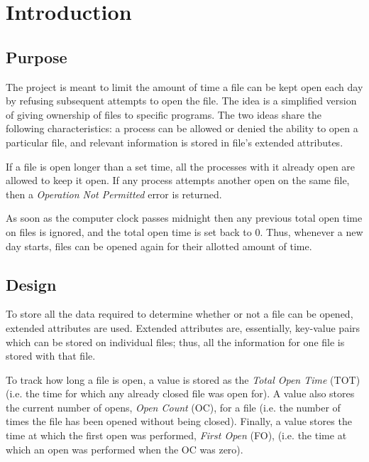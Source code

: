 \section{Introduction}

\subsection{Purpose}

The project is meant to limit the amount of time a file can be kept open each day by refusing subsequent attempts to open the file. The idea is a simplified version of giving ownership of files to specific programs. The two ideas share the following characteristics: a process can be allowed or denied the ability to open a particular file, and relevant information is stored in file's extended attributes.

If a file is open longer than a set time, all the processes with it already open are allowed to keep it open. If any process attempts another open on the same file, then a \textit{Operation Not Permitted} error is returned.

As soon as the computer clock passes midnight then any previous total open time on files is ignored, and the total open time is set back to 0. Thus, whenever a new day starts, files can be opened again for their allotted amount of time.

\subsection{Design}

To store all the data required to determine whether or not a file can be opened, extended attributes are used. Extended attributes are, essentially, key-value pairs which can be stored on individual files; thus, all the information for one file is stored with that file.

To track how long a file is open, a value is stored as the \textit{Total Open Time} (TOT) (i.e. the time for which any already closed file was open for). A value also stores the current number of opens, \textit{Open Count} (OC), for a file (i.e. the number of times the file has been opened without being closed). Finally, a value stores the time at which the first open was performed, \textit{First Open} (FO), (i.e. the time at which an open was performed when the OC was zero).

